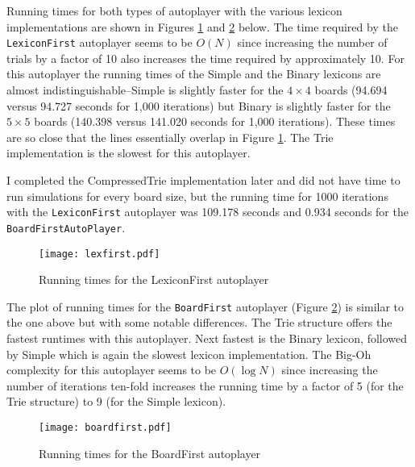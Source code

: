 \documentclass[12pt]{article}
\begin{document}
Running times for both types of autoplayer with the various lexicon implementations are shown in Figures \ref{lexfirst} and \ref{boardfirst} below. The time required by the \texttt{LexiconFirst} autoplayer seems to be $O(N)$ since increasing the number of trials by a factor of 10 also increases the time required by approximately 10. For this autoplayer the running times of the Simple and the Binary lexicons are almost indistinguishable--Simple is slightly faster for the $4 \times 4$ boards (94.694 versus 94.727 seconds for 1,000 iterations) but Binary is slightly faster for the $5 \times 5$ boards (140.398 versus 141.020 seconds for 1,000 iterations). These times are so close that the lines essentially overlap in Figure \ref{lexfirst}. The Trie implementation is the slowest for this autoplayer. 

I completed the CompressedTrie implementation later and did not have time to run simulations for every board size, but the running time for 1000 iterations with the \texttt{LexiconFirst} autoplayer was 109.178 seconds and 0.934 seconds for the \texttt{BoardFirstAutoPlayer}. 

\begin{figure}[h!]
\begin{center}
\texttt{[image: lexfirst.pdf]}
\end{center}
\caption{Running times for the LexiconFirst autoplayer}
\label{lexfirst}
\end{figure}

The plot of running times for the \texttt{BoardFirst} autoplayer (Figure \ref{boardfirst}) is similar to the one above  but with some notable differences. The Trie structure offers the fastest runtimes with this autoplayer. Next fastest is the Binary lexicon, followed by Simple which is again the slowest lexicon implementation. The Big-Oh complexity for this autoplayer seems to be $O(\log N)$ since increasing the number of iterations ten-fold increases the running time by a factor of 5 (for the Trie structure) to 9 (for the Simple lexicon). 

\begin{figure}[h!]
\begin{center}
\texttt{[image: boardfirst.pdf]}
\end{center}
\caption{Running times for the BoardFirst autoplayer}
\label{boardfirst}
\end{figure}
\end{document}
